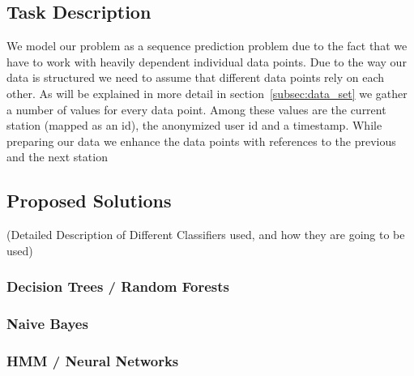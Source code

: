 \subsection{Task Description}
\label{subsec:task_description}
We model our problem as a sequence prediction problem due to the fact that we have to work with heavily dependent individual data points. Due to the way our data is structured we need to assume that different data points rely on each other. As will be explained in more detail in section~\ref{subsec:data_set} we gather a number of values for every data point. Among these values are the current station (mapped as an id), the anonymized user id and a timestamp. While preparing our data we enhance the data points with references to the previous and the next station


\subsection{Proposed Solutions}
(Detailed Description of Different Classifiers used, and how they are going to be used)

\subsubsection{Decision Trees / Random Forests}

\subsubsection{Naive Bayes}

\subsubsection{HMM / Neural Networks}